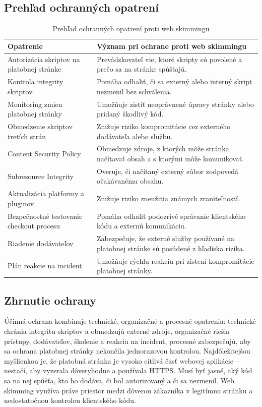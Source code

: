 \subsection{Prehľad ochranných opatrení}

\begin{table}[htbp]
    \centering
    \caption{Prehľad ochranných opatrení proti web skimmingu}
    \label{tab:protection-measures}
    \begin{tabularx}{\textwidth}{@{}p{}X@{}}
        \toprule
        \textbf{Opatrenie} & \textbf{Význam pri ochrane proti web skimmingu} \\
        \midrule
        Autorizácia skriptov na platobnej stránke & Prevádzkovateľ vie, ktoré skripty sú povolené a prečo sa na stránke spúšťajú. \\
        Kontrola integrity skriptov & Pomáha odhaliť, či sa externý alebo interný skript nezmenil bez schválenia. \\
        Monitoring zmien platobnej stránky & Umožňuje zistiť neoprávnené úpravy stránky alebo pridaný škodlivý kód. \\
        Obmedzenie skriptov tretích strán & Znižuje riziko kompromitácie cez externého dodávateľa alebo službu. \\
        Content Security Policy & Obmedzuje zdroje, z ktorých môže stránka načítavať obsah a s ktorými môže komunikovať. \\
        Subresource Integrity & Overuje, či načítaný externý súbor zodpovedá očakávanému obsahu. \\
        Aktualizácia platformy a pluginov & Znižuje riziko zneužitia známych zraniteľností. \\
        Bezpečnostné testovanie checkout procesu & Pomáha odhaliť podozrivé správanie klientského kódu a externú komunikáciu. \\
        Riadenie dodávateľov & Zabezpečuje, že externé služby používané na platobnej stránke sú posúdené z hľadiska rizika. \\
        Plán reakcie na incident & Umožňuje rýchlu reakciu pri zistení kompromitácie platobnej stránky. \\
        \bottomrule
    \end{tabularx}
\end{table}

\subsection{Zhrnutie ochrany}

Účinná ochrana kombinuje technické, organizačné a procesné opatrenia: technické chránia integritu skriptov a obmedzujú externé zdroje, organizačné riešia prístupy, dodávateľov, školenie a reakciu na incident, procesné zabezpečujú, aby sa ochrana platobnej stránky nekončila jednorazovou kontrolou. Najdôležitejšou myšlienkou je, že platobná stránka je vysoko citlivá časť webovej aplikácie -- nestačí, aby vyzerala dôveryhodne a používala HTTPS. Musí byť jasné, aký kód sa na nej spúšťa, kto ho dodáva, či bol autorizovaný a či sa nezmenil. Web skimming využíva práve priestor medzi dôverou zákazníka v legitímnu stránku a nedostatočnou kontrolou klientského kódu.
